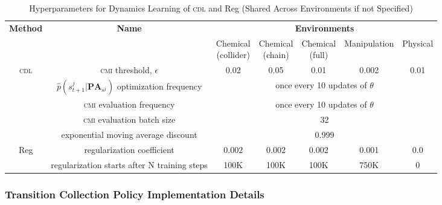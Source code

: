 \begin{table}
\centering
\caption{Hyperparameters for Dynamics Learning of \textsc{cdl} and Reg (Shared Across Environments if not Specified)}
\vspace{-0pt}
\begin{small}
\begin{tabular}{ccccccc}
\toprule
\textbf{Method} & \textbf{Name}                 & \multicolumn{5}{c}{\textbf{Environments}} \\
                &                               & \thead{Chemical\\(collider)}  
                                                & \thead{Chemical\\(chain)}  
                                                & \thead{Chemical\\(full)}  
                                                & Manipulation  & Physical    \\
\midrule
\multirow{5}{*}{\textsc{cdl}}
& \textsc{cmi} threshold, $\epsilon$            & 0.02      & 0.05      & 0.01      & 0.002     & 0.01     \\
& $\hat{p}(s^j_{t+1} | \textbf{PA}_{s^j})$ optimization frequency     & \multicolumn{5}{c}{once every 10 updates of $\theta$}     \\
& \textsc{cmi} evaluation frequency                                   & \multicolumn{5}{c}{once every 10 updates of $\theta$}     \\
& \textsc{cmi} evaluation batch size                                  & \multicolumn{5}{c}{32}                                    \\
& exponential moving average discount                                 & \multicolumn{5}{c}{0.999}                                 \\
\midrule
\multirow{2}{*}{Reg}
& regularization coefficient                    & 0.002     & 0.002     & 0.002     & 0.001     & 0.0     \\
& regularization starts after N training steps  & 100K      & 100K      & 100K      & 750K      & 0     \\
\bottomrule
\end{tabular}
\end{small}
\vspace{-0pt}
\label{tab:cdl_dynamics_hyperparams}
\end{table}

\subsubsection{Transition Collection Policy Implementation Details}
\label{app:transition_collection_policy_implementation}

